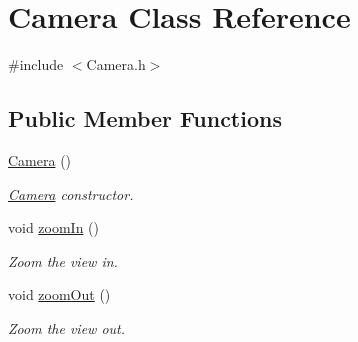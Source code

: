\hypertarget{class_camera}{}\section{Camera Class Reference}
\label{class_camera}


{\ttfamily \#include $<$Camera.\+h$>$}

\subsection*{Public Member Functions}
\begin{DoxyCompactItemize}
\item 
\hyperlink{class_camera_a01f94c3543f56ede7af49dc778f19331}{Camera} ()\hypertarget{class_camera_a01f94c3543f56ede7af49dc778f19331}{}\label{class_camera_a01f94c3543f56ede7af49dc778f19331}

\begin{DoxyCompactList}\small\item\em \hyperlink{class_camera}{Camera} constructor. \end{DoxyCompactList}\item 
void \hyperlink{class_camera_a62d35e87b3eeac9463f43c17b65ef090}{zoom\+In} ()\hypertarget{class_camera_a62d35e87b3eeac9463f43c17b65ef090}{}\label{class_camera_a62d35e87b3eeac9463f43c17b65ef090}

\begin{DoxyCompactList}\small\item\em Zoom the view in. \end{DoxyCompactList}\item 
void \hyperlink{class_camera_aafc1d985053e11bd553b8a12540a562d}{zoom\+Out} ()\hypertarget{class_camera_aafc1d985053e11bd553b8a12540a562d}{}\label{class_camera_aafc1d985053e11bd553b8a12540a562d}

\begin{DoxyCompactList}\small\item\em Zoom the view out. \end{DoxyCompactList}\end{DoxyCompactItemize}
